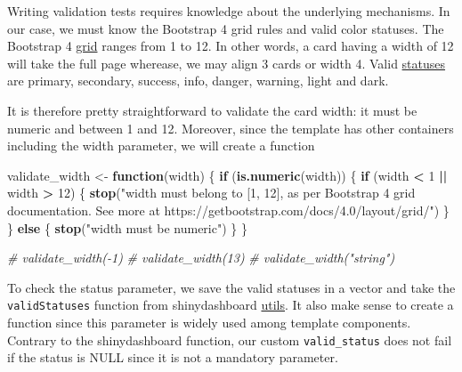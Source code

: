 \documentclass[]{book}
\newenvironment{Shaded}{\begin{snugshade}}{\end{snugshade}}
\newcommand{\CommentTok}[1]{\textcolor[rgb]{0.56,0.35,0.01}{\textit{#1}}}
\newcommand{\ControlFlowTok}[1]{\textcolor[rgb]{0.13,0.29,0.53}{\textbf{#1}}}
\newcommand{\DecValTok}[1]{\textcolor[rgb]{0.00,0.00,0.81}{#1}}
\newcommand{\KeywordTok}[1]{\textcolor[rgb]{0.13,0.29,0.53}{\textbf{#1}}}
\newcommand{\NormalTok}[1]{#1}
\newcommand{\OperatorTok}[1]{\textcolor[rgb]{0.81,0.36,0.00}{\textbf{#1}}}
\newcommand{\StringTok}[1]{\textcolor[rgb]{0.31,0.60,0.02}{#1}}
\begin{document}
Writing validation tests requires knowledge about the underlying mechanisms. In our case, we must know the Bootstrap 4 grid rules and valid color statuses. The Bootstrap 4 \href{https://getbootstrap.com/docs/4.0/layout/grid/}{grid} ranges from 1 to 12. In other words, a card having a width of 12 will take the full page wherease, we may align 3 cards or width 4. Valid \href{https://getbootstrap.com/docs/4.0/utilities/colors/}{statuses} are primary, secondary, success, info, danger, warning, light and dark.

It is therefore pretty straightforward to validate the card width: it must be numeric and between 1 and 12. Moreover, since the template has other containers including the width parameter, we will create a function

\begin{Shaded}
\begin{Highlighting}[]
\NormalTok{validate_width <-}\StringTok{ }\ControlFlowTok{function}\NormalTok{(width) \{}
  \ControlFlowTok{if}\NormalTok{ (}\KeywordTok{is.numeric}\NormalTok{(width)) \{}
    \ControlFlowTok{if}\NormalTok{ (width }\OperatorTok{<}\StringTok{ }\DecValTok{1} \OperatorTok{||}\StringTok{ }\NormalTok{width }\OperatorTok{>}\StringTok{ }\DecValTok{12}\NormalTok{) \{}
      \KeywordTok{stop}\NormalTok{(}\StringTok{"width must belong to [1, 12], as per Bootstrap 4 grid documentation. See more at https://getbootstrap.com/docs/4.0/layout/grid/"}\NormalTok{)}
\NormalTok{    \}}
\NormalTok{  \} }\ControlFlowTok{else}\NormalTok{ \{}
    \KeywordTok{stop}\NormalTok{(}\StringTok{"width must be numeric"}\NormalTok{)}
\NormalTok{  \}}
\NormalTok{\}}

\CommentTok{# validate_width(-1)}
\CommentTok{# validate_width(13)}
\CommentTok{# validate_width("string")}
\end{Highlighting}
\end{Shaded}

To check the status parameter, we save the valid statuses in a vector and take the \texttt{validStatuses} function from shinydashboard \href{https://github.com/rstudio/shinydashboard/blob/master/R/utils.R}{utils}. It also make sense to create a function since this parameter is widely used among template components. Contrary to the shinydashboard function, our custom \texttt{valid\_status} does not fail if the status is NULL since it is not a mandatory parameter.
\end{document}
